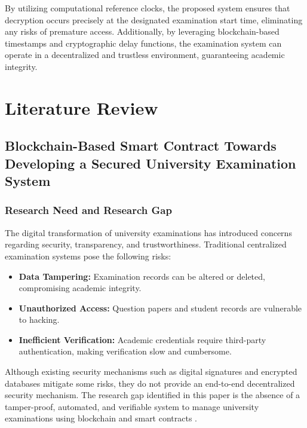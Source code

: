 \documentclass[12pt,a4paper]{article}
\begin{document}
By utilizing computational reference clocks, the proposed system ensures that decryption occurs precisely at the designated examination start time, eliminating any risks of premature access. Additionally, by leveraging blockchain-based timestamps and cryptographic delay functions, the examination system can operate in a decentralized and trustless environment, guaranteeing academic integrity.


\section{Literature Review}

\subsection{Blockchain-Based Smart Contract Towards Developing a Secured University Examination System}
\subsubsection{Research Need and Research Gap}
The digital transformation of university examinations has introduced concerns regarding security, transparency, and trustworthiness. Traditional centralized examination systems pose the following risks:
\begin{itemize}
    \item \textbf{Data Tampering:} Examination records can be altered or deleted, compromising academic integrity.
    \item \textbf{Unauthorized Access:} Question papers and student records are vulnerable to hacking.
    \item \textbf{Inefficient Verification:} Academic credentials require third-party authentication, making verification slow and cumbersome.
\end{itemize}
Although existing security mechanisms such as digital signatures and encrypted databases mitigate some risks, they do not provide an end-to-end decentralized security mechanism. The research gap identified in this paper is the absence of a tamper-proof, automated, and verifiable system to manage university examinations using blockchain and smart contracts \cite{samanta2021blockchain} \cite{8783053}.
\end{document}
